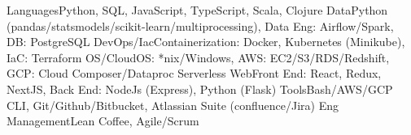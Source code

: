 \begin{additionals}
  \addional
    {Languages}{Python, SQL, JavaScript, TypeScript, Scala, Clojure}
  \addional
    {Data}{Python (pandas/statsmodels/scikit-learn/multiprocessing), Data Eng: Airflow/Spark, DB: PostgreSQL}
  \addional
    {DevOps/Iac}{Containerization: Docker, Kubernetes (Minikube), IaC: Terraform}
  \addional
    {OS/Cloud}{OS: *nix/Windows, AWS: EC2/S3/RDS/Redshift, GCP: Cloud Composer/Dataproc Serverless}
  \addional
      {Web}{Front End: React, Redux, NextJS, Back End: NodeJs (Express), Python (Flask)}
  \addional
    {Tools}{Bash/AWS/GCP CLI, Git/Github/Bitbucket, Atlassian Suite (confluence/Jira)}
  \addional
    {Eng Management}{Lean Coffee, Agile/Scrum}
\end{additionals}